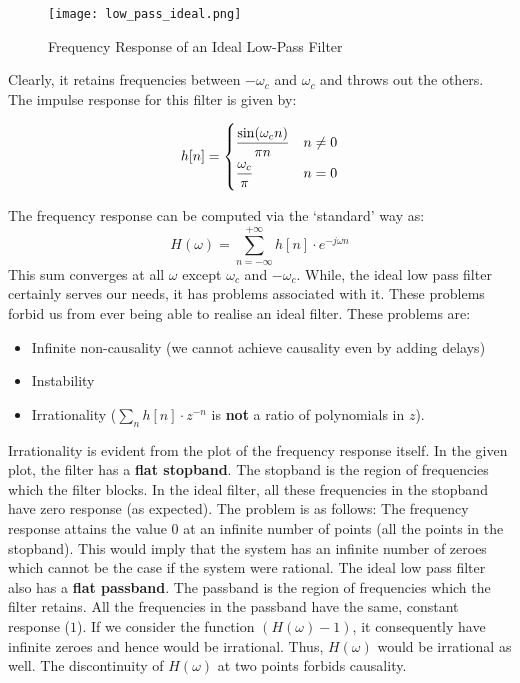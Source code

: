 \documentclass{article}
\theoremstyle{definition}
\begin{document}
\begin{figure}[h!]
\centering
\texttt{[image: low\_pass\_ideal.png]}
\caption{Frequency Response of an Ideal Low-Pass Filter}
\label{fig:low_pass_ideal}
\end{figure}	 

Clearly, it retains frequencies between $-\omega_c$ and $\omega_c$ and throws out the others. The impulse response for this filter is given by:

\[
	h[n] = 
	\begin{dcases}
    \frac{\sin(\omega_c n)}{\pi n} & n \neq 0 \\
    \frac{\omega_c}{\pi} & n=0 \\
  	\end{dcases}
\]

The frequency response can be computed via the `standard' way as:
\[
    H(\omega) = \sum_{n = -\infty}^{+\infty} h[n] \cdot e^{-j\omega n}
\]
This sum converges at all $\omega$ except $\omega_c$ and $-\omega_c$. While, the ideal low pass filter certainly serves our needs, it has problems associated with it. These problems forbid us from ever being able to realise an ideal filter. These problems are:

\begin{itemize}
    \item Infinite non-causality (we cannot achieve causality even by adding delays)
    \item Instability
    \item Irrationality ($\sum_n h[n] \cdot z^{-n}$ is \textbf{not} a ratio of polynomials in $z$).
\end{itemize}

Irrationality is evident from the plot of the frequency response itself. In the given plot, the filter has a \textbf{flat stopband}. The stopband is the region of frequencies which the filter blocks. In the ideal filter, all these frequencies in the stopband have zero response (as expected). The problem is as follows: The frequency response attains the value $0$ at an infinite number of points (all the points in the stopband). This would imply that the system has an infinite number of zeroes which cannot be the case if the system were rational. The ideal low pass filter also has a \textbf{flat passband}. The passband is the region of frequencies which the filter retains. All the frequencies in the passband have the same, constant response ($1$). If we consider the function $(H(\omega) - 1)$, it consequently have infinite zeroes and hence would be irrational. Thus, $H(\omega)$ would be irrational as well. The discontinuity of $H(\omega)$ at two points forbids causality. \smallskip
\end{document}
